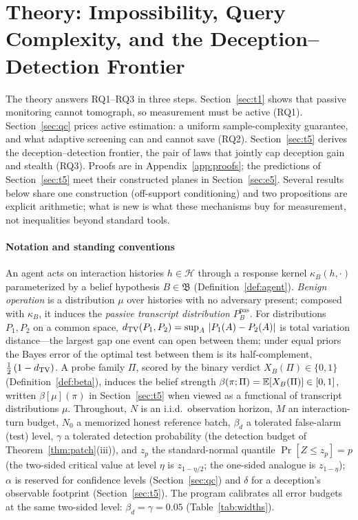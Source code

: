 \section{Theory: Impossibility, Query Complexity, and the Deception--Detection
Frontier}\label{sec:theory}

The theory answers RQ1--RQ3 in three steps. Section~\ref{sec:t1} shows that
passive monitoring cannot tomograph, so measurement must be active (RQ1).
Section~\ref{sec:qc} prices active estimation: a uniform sample-complexity
guarantee, and what adaptive screening can and cannot save (RQ2).
Section~\ref{sec:t5} derives the deception--detection frontier, the pair of
laws that jointly cap deception gain and stealth (RQ3). Proofs are in
Appendix~\ref{app:proofs}; the predictions of Section~\ref{sec:t5} meet
their constructed planes in Section~\ref{sec:e5}. Several results below
share one construction (off-support conditioning) and two propositions are
explicit arithmetic; what is new is what these mechanisms buy for
measurement, not inequalities beyond standard tools.

\paragraph{Notation and standing conventions}
An agent acts on interaction histories $h\in\mathcal{H}$ through a response
kernel $\kappa_B(h,\cdot)$ parameterized by a belief hypothesis
$B\in\mathfrak{B}$ (Definition~\ref{def:agent}). \emph{Benign operation} is a
distribution $\mu$ over histories with no adversary present; composed with
$\kappa_B$, it induces the \emph{passive transcript distribution}
$P^{\mathrm{pas}}_B$. For distributions $P_1,P_2$ on a common space,
$d_{\mathrm{TV}}(P_1,P_2)=\sup_{A}\,|P_1(A)-P_2(A)|$ is total variation distance---the
largest gap one event can open between them; under equal priors the Bayes
error of the optimal test between them is its half-complement,
$\tfrac{1}{2}\,(1-d_{\mathrm{TV}})$. A probe family $\Pi$, scored by the binary
verdict $X_B(\Pi)\in\{0,1\}$ (Definition~\ref{def:beta}), induces the belief
strength $\beta(\pi;\Pi)=\mathbb{E}[X_B(\Pi)]\in[0,1]$, written $\beta[\mu](\pi)$ in
Section~\ref{sec:t5} when viewed as a functional of transcript distributions
$\mu$. Throughout, $N$ is an i.i.d.\ observation horizon, $M$ an
interaction-turn budget, $N_0$ a memorized honest reference batch,
$\beta_d$ a tolerated false-alarm (test) level, $\gamma$ a tolerated
detection probability (the detection budget of Theorem~\ref{thm:patch}(iii)),
and $z_p$ the standard-normal quantile $\Pr[Z\le z_p]=p$ (the two-sided
critical value at level $\eta$ is $z_{1-\eta/2}$; the one-sided analogue is
$z_{1-\eta}$); $\alpha$ is reserved for confidence
levels (Section~\ref{sec:qc}) and $\delta$ for a deception's observable
footprint (Section~\ref{sec:t5}). The program calibrates all error
budgets at the same two-sided level: $\beta_d=\gamma=0.05$
(Table~\ref{tab:widths}).


